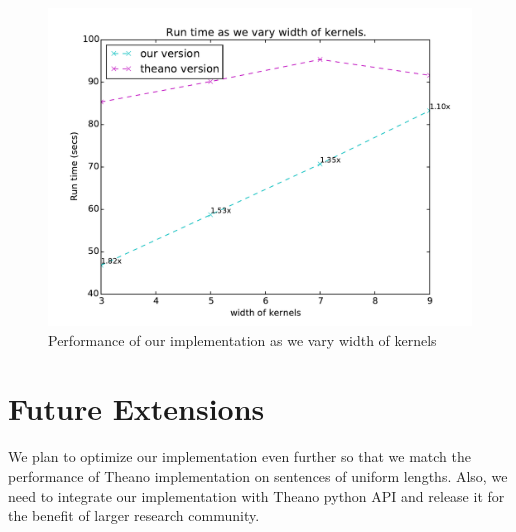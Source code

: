 \documentclass{article}
\begin{document}
 \begin{figure}[!htbp]
\begin{center}
\includegraphics[scale=0.6]{w-kerns.pdf}
\end{center}
\caption{Performance of our implementation as we vary width of kernels}
\label{fig:w_kerns}
\end{figure}
 
\section*{Future Extensions}
 
We plan to optimize our implementation even further so that we match the performance of Theano implementation on sentences of uniform lengths. Also, we need to integrate our implementation with Theano python API and release it for the benefit of larger research community. 

\clearpage



\end{document}
